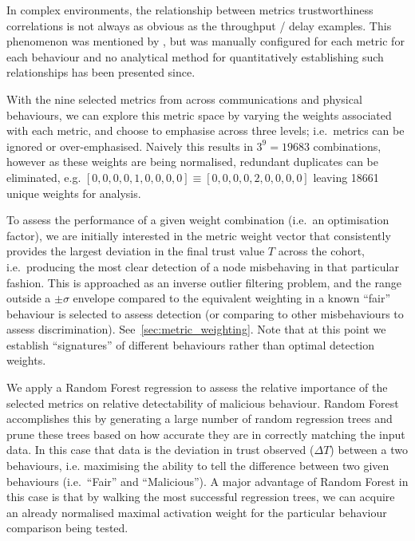 In complex environments, the relationship between metrics trustworthiness correlations is not always as obvious as the throughput / delay examples.
This phenomenon was mentioned by \citet{Guo2012}, but was manually configured for each metric for each behaviour and no analytical method for quantitatively establishing such relationships has been presented since.

With the nine selected metrics from across communications and physical behaviours, we can explore this metric space by varying the weights associated with each metric, and choose to emphasise across three levels; i.e.\ metrics can be ignored or over-emphasised. Naively this results in $3^9 = 19683$ combinations, however as these weights are being normalised, redundant duplicates can be eliminated, e.g. $[0,0,0,0,1,0,0,0,0] \equiv [0,0,0,0,2,0,0,0,0]$ leaving 18661 unique weights for analysis.

To assess the performance of a given weight combination (i.e.\ an optimisation factor), we are initially interested in the metric weight vector that consistently provides the largest deviation in the final trust value $T$ across the cohort, i.e.\ producing the most clear detection of a node misbehaving in that particular fashion.
This is approached as an inverse outlier filtering problem, and the range outside a $\pm\sigma$ envelope compared to the equivalent weighting in a known ``fair'' behaviour is selected to assess detection (or comparing to other misbehaviours to assess discrimination).
See~\autoref{sec:metric_weighting}.
Note that at this point we establish ``signatures'' of different behaviours rather than optimal detection weights.

We apply a Random Forest regression \cite{Breiman2001} to assess the relative importance of the selected metrics on relative detectability of malicious behaviour. 
Random Forest accomplishes this by generating a large number of random regression trees and prune these trees based on how accurate they are in correctly matching the input data.
In this case that data is the deviation in trust observed ($\Delta T$) between a two behaviours, i.e. maximising the ability to tell the difference between two given behaviours (i.e.\ ``Fair'' and ``Malicious'').
A major advantage of Random Forest in this case is that by walking the most successful regression trees, we can acquire an already normalised maximal activation weight for the particular behaviour comparison being tested.

